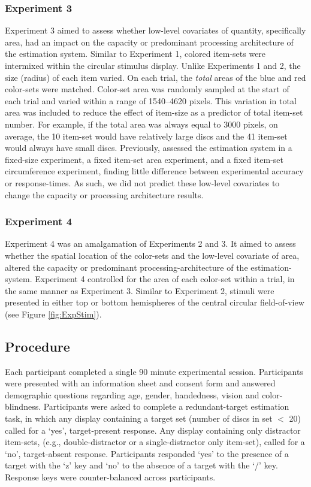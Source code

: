 \subsubsection{Experiment 3}
Experiment 3 aimed to assess whether low-level covariates of quantity, specifically area, had an impact on the capacity or predominant processing architecture of the estimation system. Similar to Experiment 1, colored item-sets were intermixed within the circular stimulus display. Unlike Experiments 1 and 2, the size (radius) of each item varied. On each trial, the \textit{total} areas of the blue and red color-sets were matched. Color-set area was randomly sampled at the start of each trial and varied within a range of 1540--4620 pixels. This variation in total area was included to reduce the effect of item-size as a predictor of total item-set number. For example, if the total area was always equal to 3000 pixels, on average, the 10 item-set would have relatively large discs and the 41 item-set would always have small discs. Previously,  assessed the estimation system in a fixed-size experiment, a fixed item-set area experiment, and a fixed item-set circumference experiment, finding little difference between experimental accuracy or response-times. As such, we did not predict these low-level covariates to change the capacity or processing architecture results.


\subsubsection{Experiment 4}
Experiment 4 was an amalgamation of Experiments 2 and 3. It aimed to assess whether the spatial location of the color-sets and the low-level covariate of area, altered the capacity or predominant processing-architecture of the estimation-system. Experiment 4 controlled for the area of each color-set within a trial, in the same manner as Experiment 3. Similar to Experiment 2, stimuli were presented in either top or bottom hemispheres of the central circular field-of-view (see Figure \ref{fig:ExpStim}).

\subsection{Procedure}
Each participant completed a single 90 minute experimental session. Participants were presented with an information sheet and consent form and answered demographic questions regarding age, gender, handedness, vision and color-blindness. Participants were asked to complete a redundant-target estimation task, in which any display containing a target set (number of discs in set $<$ 20) called for a `yes', target-present response. Any display containing only distractor item-sets, (e.g., double-distractor or a single-distractor only item-set), called for a `no', target-absent response. Participants responded `yes' to the presence of a target with the `z' key and `no' to the absence of a target with the `/' key. Response keys were counter-balanced across participants.

